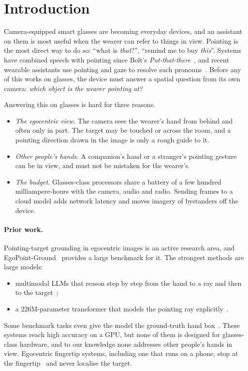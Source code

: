 \section{Introduction}\label{sec:intro}

Camera-equipped smart glasses are becoming everyday devices, and an assistant on them is most useful when the wearer can refer to things in view. Pointing is the most direct way to do so: ``what is \emph{that}?'', ``remind me to buy \emph{this}''. Systems have combined speech with pointing since Bolt's \emph{Put-that-there}~\cite{bolt1980put}, and recent wearable assistants use pointing and gaze to resolve such pronouns~\cite{lee2024gazepointar}. Before any of this works on glasses, the device must answer a spatial question from its own camera: \emph{which object is the wearer pointing at?}

Answering this on glasses is hard for three reasons.
\begin{itemize}
\item \emph{The egocentric view.} The camera sees the wearer's hand from behind and often only in part. The target may be touched or across the room, and a pointing direction drawn in the image is only a rough guide to it.
\item \emph{Other people's hands.} A companion's hand or a stranger's pointing gesture can be in view, and must not be mistaken for the wearer's.
\item \emph{The budget.} Glasses-class processors share a battery of a few hundred milliampere-hours with the camera, audio and radio. Sending frames to a cloud model adds network latency and moves imagery of bystanders off the device.
\end{itemize}

\paragraph{Prior work.} Pointing-target grounding in egocentric images is an active research area, and EgoPoint-Ground~\cite{egopoint} provides a large benchmark for it. The strongest methods are large models:
\begin{itemize}
\item multimodal LLMs that reason step by step from the hand to a ray and then to the target~\cite{egopoint,li2026pointvgr};
\item a 226M-parameter transformer that models the pointing ray explicitly~\cite{li2026vistaref}.
\end{itemize}
Some benchmark tasks even give the model the ground-truth hand box~\cite{egopoint}. These systems reach high accuracy on a GPU, but none of them is designed for glasses-class hardware, and to our knowledge none addresses other people's hands in view. Egocentric fingertip systems, including one that runs on a phone, stop at the fingertip~\cite{huang2016pointing,jain2019gestarlite} and never localise the target.

